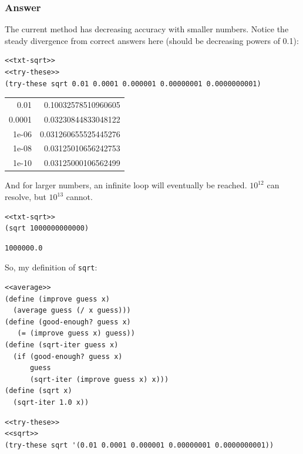 \documentclass[final,fleqn,titlepage,twoside]{article}
\begin{document}
\subsubsection{Answer}
\label{sec:org8ebfafe}
The current method has decreasing accuracy with smaller numbers. Notice the
steady divergence from correct answers here (should be decreasing powers of
0.1):
\begin{verbatim}
<<txt-sqrt>>
<<try-these>>
(try-these sqrt 0.01 0.0001 0.000001 0.00000001 0.0000000001)
\end{verbatim}

\begin{center}
\begin{tabular}{rr}
0.01 & 0.10032578510960605\\[0pt]
0.0001 & 0.03230844833048122\\[0pt]
1e-06 & 0.031260655525445276\\[0pt]
1e-08 & 0.03125010656242753\\[0pt]
1e-10 & 0.03125000106562499\\[0pt]
\end{tabular}
\end{center}

And for larger numbers, an infinite loop will eventually be reached. \(10^{12}\)
can resolve, but \(10^{13}\) cannot.

\begin{verbatim}
<<txt-sqrt>>
(sqrt 1000000000000)
\end{verbatim}

\begin{verbatim}
1000000.0
\end{verbatim}

So, my definition of \texttt{sqrt}:
\begin{verbatim}
<<average>>
(define (improve guess x)
  (average guess (/ x guess)))
(define (good-enough? guess x)
   (= (improve guess x) guess))
(define (sqrt-iter guess x)
  (if (good-enough? guess x)
      guess
      (sqrt-iter (improve guess x) x)))
(define (sqrt x)
  (sqrt-iter 1.0 x))
\end{verbatim}
\begin{verbatim}
<<try-these>>
<<sqrt>>
(try-these sqrt '(0.01 0.0001 0.000001 0.00000001 0.0000000001))
\end{verbatim}
\end{document}
